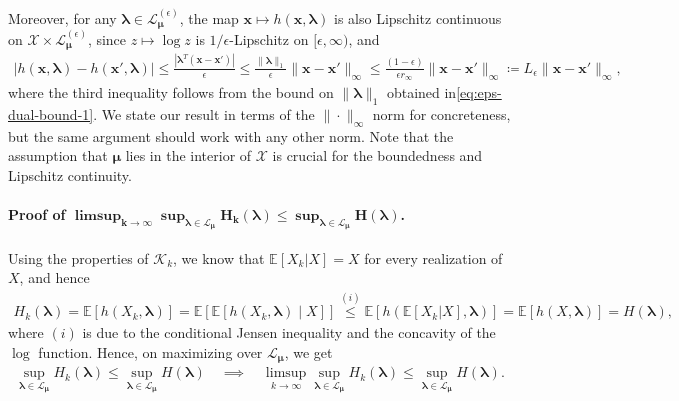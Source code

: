 \documentclass{article}
\theoremstyle{plain}
\theoremstyle{definition}
\newcommand{\calX}{\mathcal X}
\newcommand{\calL}{\mathcal L}
\newcommand{\calK}{\mathcal{K}}
\newcommand{\xvec}{\mathbf{x}}
\newcommand{\boldlambda}{\boldsymbol{\lambda}}
\newcommand{\boldmu}{\boldsymbol{\mu}}
\newcommand{\dualdomain}{\calL_{\boldmu}}
\newcommand{\epsdualdomain}{\calL_{\boldmu}^{(\epsilon)}}
\begin{document}
Moreover, for any $\boldlambda \in \epsdualdomain$, the  map $\xvec \mapsto h(\xvec, \boldlambda)$ is {also Lipschitz continuous} on $\calX \times \epsdualdomain$, since $z \mapsto \log z$ is $1/\epsilon$-Lipschitz on $[\epsilon, \infty)$, and  
\begin{align}
    |h(\xvec, \boldlambda) - h(\xvec', \boldlambda)| \leq \frac{|\boldlambda^T(\xvec - \xvec')|}{\epsilon}  \leq \frac{\|\boldlambda\|_1}{\epsilon} \|\xvec-\xvec'\|_\infty \leq \frac{(1-\epsilon)}{\epsilon r_\infty} \|\xvec-\xvec'\|_\infty
    \coloneqq L_\epsilon \|\xvec-\xvec'\|_\infty, 
\end{align}
where the third inequality follows from the bound on $\|\boldlambda\|_1$ obtained in\eqref{eq:eps-dual-bound-1}. 
We state our result in terms of the $\|\cdot\|_\infty$ norm for concreteness, but the same argument should work with any other norm. Note that the assumption that $\boldmu$ lies in the interior of $\calX$ is crucial for the boundedness and Lipschitz continuity. 

\paragraph{Proof of $\boldsymbol{\limsup_{k \to \infty} \sup_{\boldlambda\in \dualdomain} H_k(\boldlambda) \leq \sup_{\boldlambda \in \dualdomain} H(\boldlambda)}$.} Using the properties of $\calK_k$, we know that $\mathbb{E}[X_k|X] = X$ for every realization of $X$, and hence 
\begin{align}
    H_k(\boldlambda) = \mathbb{E}[h(X_k, \boldlambda)] = \mathbb{E}[\mathbb{E}[h(X_k, \boldlambda) \mid X]] \stackrel{(i)}{\leq} \mathbb{E}[ h(\mathbb{E}[X_k|X], \boldlambda)] = \mathbb{E}[h(X, \boldlambda)] = H(\boldlambda),  \label{eq:interchange-2-proof-1}
\end{align}
where $(i)$ is due to the conditional Jensen inequality and the concavity of the $\log$ function.  Hence, on maximizing over $\dualdomain$, we get 
\begin{align}
    \sup_{\boldlambda \in \dualdomain} H_k(\boldlambda) \leq  \sup_{\boldlambda \in \dualdomain} H(\boldlambda) \quad \implies \quad   
    \limsup_{k \to \infty} \sup_{\boldlambda \in \dualdomain} H_k(\boldlambda) \leq  \sup_{\boldlambda \in \dualdomain} H(\boldlambda). \label{eq:interchange-2-proof-2}
\end{align}
\end{document}
